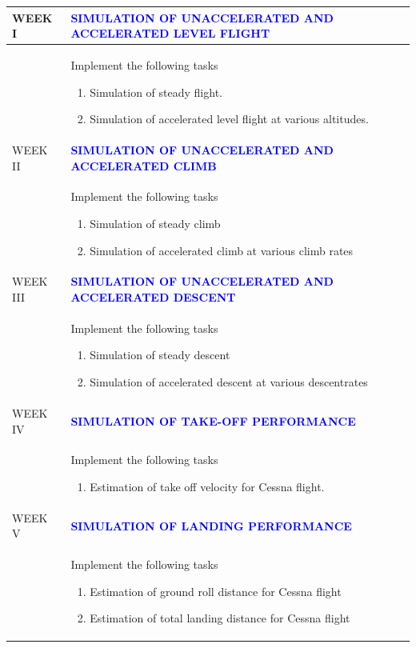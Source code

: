 \documentclass[11pt]{exam}
\begin{document}
	\centering
	\renewcommand{\arraystretch}{1.2}
\begin{longtable}{|>{\centering\arraybackslash}p{2cm}  | >{\raggedright\arraybackslash}p{14cm}  | }
		\hline 
		WEEK I & \textcolor{blue}{\textbf{SIMULATION OF UNACCELERATED AND ACCELERATED LEVEL FLIGHT}}\\
	\hline
	& Implement the following tasks
	\begin{enumerate}
		\item Simulation of steady flight.
		\item Simulation of accelerated level flight at various altitudes.
	\end{enumerate}
 \\\hline
	WEEK II & \textcolor{blue}{\textbf{SIMULATION OF UNACCELERATED AND ACCELERATED CLIMB}}\\
	\hline
	& Implement the following tasks
		\begin{enumerate}
	\item  Simulation of steady climb
	\item Simulation of accelerated climb at various climb rates 
\end{enumerate}\\	\hline
	WEEK III & \textcolor{blue}{\textbf{SIMULATION OF UNACCELERATED AND ACCELERATED DESCENT}}\\
	\hline
	& Implement the following tasks
	\begin{enumerate}
		\item Simulation of steady descent
	\item Simulation of accelerated descent at various descentrates
\end{enumerate}
	 \\
	\hline
	WEEK IV & \textcolor{blue}{\textbf{SIMULATION OF TAKE-OFF PERFORMANCE}}\\
	\hline
	& Implement the following tasks 
	\begin{enumerate}
		\item Estimation of take off velocity for Cessna flight.
	\end{enumerate}
		\\
	\hline
	WEEK V & \textcolor{blue}{\textbf{SIMULATION OF LANDING PERFORMANCE}}\\
	\hline
	& Implement the following tasks
	\begin{enumerate}
	\item Estimation of ground roll distance for Cessna flight
	\item Estimation of total landing distance for Cessna flight 

\end{enumerate}
\end{longtable}
\end{document}
